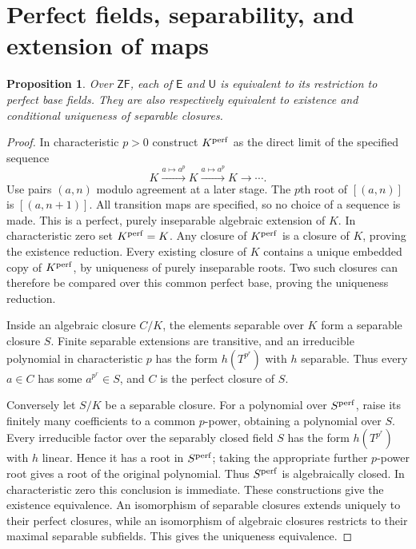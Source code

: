 \documentclass[11pt,a4paper]{article}
\newtheorem{proposition}[theorem]{Proposition}
\theoremstyle{definition}\newtheorem{definition}[theorem]{Definition}
\theoremstyle{remark}\newtheorem{remark}[theorem]{Remark}
\newcommand{\ZF}{\mathsf{ZF}}\newcommand{\ZFA}{\mathsf{ZFA}}
\newcommand{\E}{\mathsf E}\newcommand{\U}{\mathsf U}
\begin{document}
\section{Perfect fields, separability, and extension of maps}
\begin{proposition}\label{prop:perfect}
Over $\ZF$, each of $\E$ and $\U$ is equivalent to its restriction to perfect base fields. They are also respectively equivalent to existence and conditional uniqueness of separable closures.
\end{proposition}
\begin{proof}
In characteristic $p>0$ construct $K^{\rm perf}$ as the direct limit of the specified sequence
\[
K\xrightarrow{a\mapsto a^p}K\xrightarrow{a\mapsto a^p}K\longrightarrow\cdots.
\]
Use pairs $(a,n)$ modulo agreement at a later stage. The $p$th root of $[(a,n)]$ is $[(a,n+1)]$. All transition maps are specified, so no choice of a sequence is made. This is a perfect, purely inseparable algebraic extension of $K$. In characteristic zero set $K^{\rm perf}=K$. Any closure of $K^{\rm perf}$ is a closure of $K$, proving the existence reduction. Every existing closure of $K$ contains a unique embedded copy of $K^{\rm perf}$, by uniqueness of purely inseparable roots. Two such closures can therefore be compared over this common perfect base, proving the uniqueness reduction.

Inside an algebraic closure $C/K$, the elements separable over $K$ form a separable closure $S$. Finite separable extensions are transitive, and an irreducible polynomial in characteristic $p$ has the form $h(T^{p^r})$ with $h$ separable. Thus every $a\in C$ has some $a^{p^r}\in S$, and $C$ is the perfect closure of $S$.

Conversely let $S/K$ be a separable closure. For a polynomial over $S^{\rm perf}$, raise its finitely many coefficients to a common $p$-power, obtaining a polynomial over $S$. Every irreducible factor over the separably closed field $S$ has the form $h(T^{p^r})$ with $h$ linear. Hence it has a root in $S^{\rm perf}$; taking the appropriate further $p$-power root gives a root of the original polynomial. Thus $S^{\rm perf}$ is algebraically closed. In characteristic zero this conclusion is immediate. These constructions give the existence equivalence. An isomorphism of separable closures extends uniquely to their perfect closures, while an isomorphism of algebraic closures restricts to their maximal separable subfields. This gives the uniqueness equivalence.
\end{proof}
\end{document}
